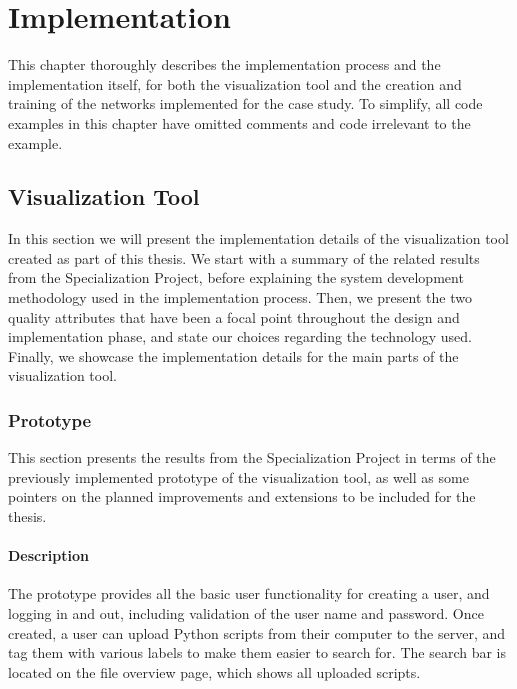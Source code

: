 
\chapter{Implementation}\label{chap:implementation}

This chapter thoroughly describes the implementation process and the implementation itself, for both the visualization tool and the creation and training of the networks implemented for the case study. To simplify, all code examples in this chapter have omitted comments and code irrelevant to the example.

\section{Visualization Tool}

In this section we will present the implementation details of the visualization tool created as part of this thesis. We start with a summary of the related results from the Specialization Project, before explaining the system development methodology used in the implementation process. Then, we present the two quality attributes that have been a focal point throughout the design and implementation phase, and state our choices regarding the technology used. Finally, we showcase the implementation details for the main parts of the visualization tool.

\subsection{Prototype}

This section presents the results from the Specialization Project in terms of the previously implemented prototype of the visualization tool, as well as some pointers on the planned improvements and extensions to be included for the thesis.

\subsubsection{Description}


\noindent The prototype provides all the basic user functionality for creating a user, and logging in and out, including validation of the user name and password. Once created, a user can upload Python scripts from their computer to the server, and tag them with various labels to make them easier to search for. The search bar is located on the file overview page, which shows all uploaded scripts. \\

